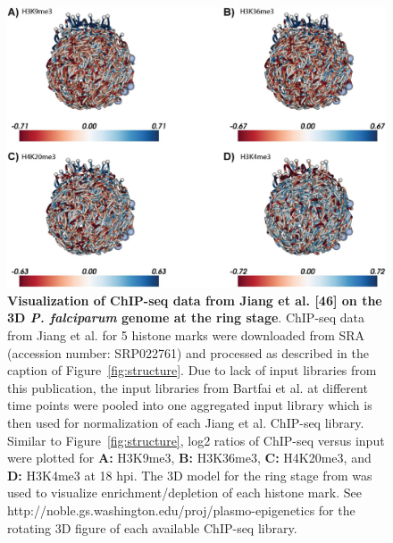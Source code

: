\begin{figure}
\begin{center}
\includegraphics[width=\linewidth]{figures/fig3.png}
\end{center}
\caption{\textbf{Visualization of ChIP-seq data from Jiang et al. [46] on the
3D {\em P.
 falciparum} genome at the ring stage}.
 ChIP-seq data from Jiang et al. for 5 histone marks were downloaded from SRA
 (accession number: SRP022761) and processed as described in the caption of
 Figure~\ref{fig:structure}. Due to lack of input libraries from this publication, the input
 libraries from Bartfai et al. at different time points were pooled into one
 aggregated input library which is then used for normalization of each Jiang
 et al. ChIP-seq library. Similar to Figure~\ref{fig:structure}, log2 ratios of ChIP-seq versus
 input were plotted for \textbf{A:} H3K9me3, \textbf{B:} H3K36me3, \textbf{C:}
 H4K20me3, and \textbf{D:} H3K4me3
 at 18 hpi. The 3D model for the ring stage from \citep{ay:three-dimensional} was used to
 visualize enrichment/depletion of each histone mark. See
 http://noble.gs.washington.edu/proj/plasmo-epigenetics for the rotating 3D
 figure of each available ChIP-seq library.
}
\label{fig:histone}
\end{figure}

